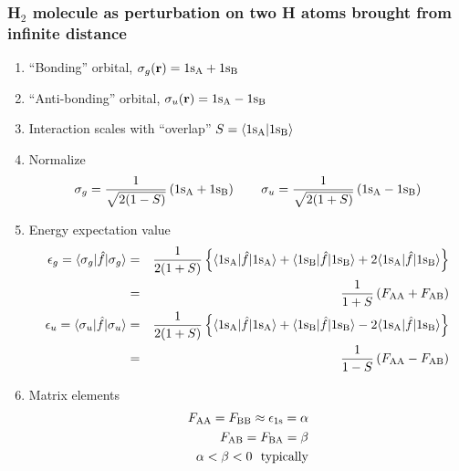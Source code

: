 \documentclass[11pt]{article}
\begin{document}
\subsubsection{H\(_2\) molecule as perturbation on two H atoms brought from infinite distance}
\label{sec:orgf992096}
\begin{enumerate}
\item ``Bonding'' orbital, \(\sigma_g({\bf r}) = 1{\rm s_A}+1{\rm s_B}\)
\item ``Anti-bonding'' orbital, \(\sigma_u({\bf r}) = 1{\rm s_A}-1{\rm s_B}\)
\item Interaction scales with ``overlap'' \(S = \langle 1{\rm s_A} | 1{\rm
            s_B} \rangle\)
\item Normalize
\begin{displaymath}
\sigma_g = \frac{1}{\sqrt{2(1-S)}}\left ( 1{\rm s_A}+1{\rm s_B} \right)     \quad\quad
\sigma_u = \frac{1}{\sqrt{2(1+S)}}\left ( 1{\rm s_A}-1{\rm s_B} \right)
\end{displaymath}
\item Energy expectation value
\begin{eqnarray*}
\epsilon_g = \langle \sigma_g | \hat{f} | \sigma_g \rangle & = & \frac{1}{2(1+S)} \left \{ \langle 1{\rm s_A} | \hat{f} | 1{\rm s_A} \rangle +  \langle 1{\rm s_B} | \hat{f} | 1{\rm s_B} \rangle + 2 \langle 1{\rm s_A} | \hat{f} |1{\rm s_B} \rangle \right \}\\
& = & \frac{1}{1+S} \left ( F_{\rm AA} + F_{\rm AB} \right ) \\
\epsilon_u = \langle \sigma_u | \hat{f} | \sigma_u \rangle & = & \frac{1}{2(1+S)} \left \{ \langle 1{\rm s_A} | \hat{f} | 1{\rm s_A} \rangle + \langle 1{\rm s_B} | \hat{f} | 1{\rm s_B} \rangle - 2 \langle 1{\rm s_A} | \hat{f} | 1{\rm s_B} \rangle\right \}\\
& = & \frac{1}{1-S} \left ( F_{\rm AA} - F_{\rm AB} \right )
\end{eqnarray*}
\item Matrix elements
\begin{eqnarray*}
  F_{\rm AA}=F_{\rm BB}\approx \epsilon_{1\mathrm{s}}=\alpha \\
  F_{\rm AB}=F_{\rm BA}=\beta \\
  \alpha < \beta < 0\ \ \mathrm{typically}
\end{eqnarray*}
\begin{center}

\end{center}
\end{enumerate}
\end{document}
